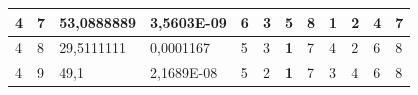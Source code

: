 \documentclass[conference]{IEEEtran}
\begin{document}
\begin{table}[]
\begin{tabular}{|llll|llllllll|}
\multicolumn{1}{|l|}{4}                                                     & \multicolumn{1}{l|}{7}                                                        & \multicolumn{1}{l|}{53,0888889}                                                   & 3,5603E-09                     & \multicolumn{1}{l|}{6}                                                  & \multicolumn{1}{l|}{3}                                                  & \multicolumn{1}{l|}{5}                                                  & \multicolumn{1}{l|}{8}                                                  & \multicolumn{1}{l|}{\textbf{1}}                                         & \multicolumn{1}{l|}{2}                                                  & \multicolumn{1}{l|}{4}                                                  & 7                          \\ \hline
\multicolumn{1}{|l|}{4}                                                     & \multicolumn{1}{l|}{8}                                                        & \multicolumn{1}{l|}{29,5111111}                                                   & 0,0001167                      & \multicolumn{1}{l|}{5}                                                  & \multicolumn{1}{l|}{3}                                                  & \multicolumn{1}{l|}{\textbf{1}}                                         & \multicolumn{1}{l|}{7}                                                  & \multicolumn{1}{l|}{4}                                                  & \multicolumn{1}{l|}{2}                                                  & \multicolumn{1}{l|}{6}                                                  & 8                          \\ \hline
\multicolumn{1}{|l|}{4}                                                     & \multicolumn{1}{l|}{9}                                                        & \multicolumn{1}{l|}{49,1}                                                         & 2,1689E-08                     & \multicolumn{1}{l|}{5}                                                  & \multicolumn{1}{l|}{2}                                                  & \multicolumn{1}{l|}{\textbf{1}}                                         & \multicolumn{1}{l|}{7}                                                  & \multicolumn{1}{l|}{3}                                                  & \multicolumn{1}{l|}{4}                                                  & \multicolumn{1}{l|}{6}                                                  & 8                          \\ \hline

\end{tabular}
\end{table}
\end{document}
